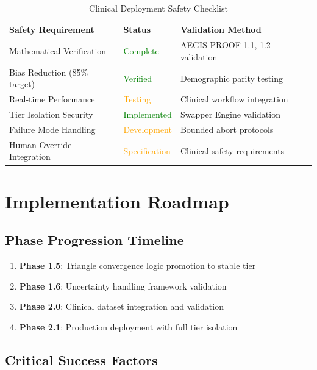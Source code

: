 \documentclass[11pt,letterpaper]{article}
\begin{document}
\begin{table}[h]
\centering
\begin{tabular}{p{4cm}|p{3cm}|p{6cm}}
\toprule
\textbf{Safety Requirement} & \textbf{Status} & \textbf{Validation Method} \\
\midrule
Mathematical Verification & \textcolor{green}{Complete} & AEGIS-PROOF-1.1, 1.2 validation \\
Bias Reduction (85\% target) & \textcolor{green}{Verified} & Demographic parity testing \\
Real-time Performance & \textcolor{orange}{Testing} & Clinical workflow integration \\
Tier Isolation Security & \textcolor{green}{Implemented} & Swapper Engine validation \\
Failure Mode Handling & \textcolor{orange}{Development} & Bounded abort protocols \\
Human Override Integration & \textcolor{orange}{Specification} & Clinical safety requirements \\
\bottomrule
\end{tabular}
\caption{Clinical Deployment Safety Checklist}
\end{table}

\section{Implementation Roadmap}
\label{sec:roadmap}

\subsection{Phase Progression Timeline}

\begin{enumerate}
    \item \textbf{Phase 1.5}: Triangle convergence logic promotion to stable tier
    \item \textbf{Phase 1.6}: Uncertainty handling framework validation
    \item \textbf{Phase 2.0}: Clinical dataset integration and validation
    \item \textbf{Phase 2.1}: Production deployment with full tier isolation
\end{enumerate}

\subsection{Critical Success Factors}
\end{document}
